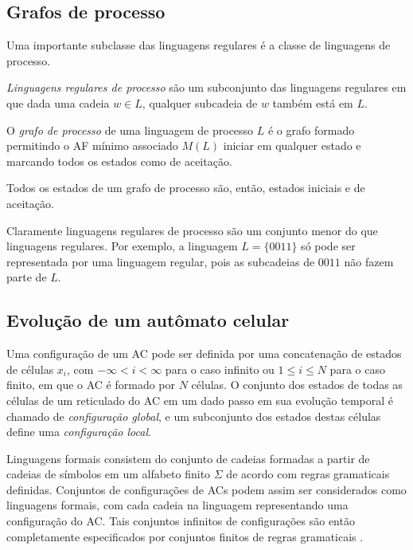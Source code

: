 \documentclass[12pt,a4paper]{article}
\newenvironment{definition}[1][Definição]{\begin{trivlist}
\item[\hskip \labelsep {\bfseries #1}]}{\end{trivlist}}
\begin{document}
\subsection{Grafos de processo}

Uma importante subclasse das linguagens regulares é a classe de linguagens
de processo. 

\begin{definition}
\textit{Linguagens regulares de processo} são um subconjunto das linguagens regulares
em que dada uma cadeia $w \in L$, qualquer subcadeia de $w$ também
está em $L$.
\end{definition}

\begin{definition}
O \textit{grafo de processo} de uma linguagem de processo $L$ é o grafo
formado permitindo o AF mínimo associado $M(L)$ iniciar em qualquer
estado e marcando todos os estados como de aceitação.
\end{definition}

Todos os estados de um grafo de processo são, então, estados iniciais e de
aceitação.

Claramente linguagens regulares de processo são um conjunto menor do que
linguagens regulares. Por exemplo, a linguagem $L = \{0011\}$ só pode ser
representada por uma linguagem regular, pois as subcadeias de $0011$ não
fazem parte de $L$.

\subsection{Evolução de um autômato celular}

Uma configuração de um AC pode ser definida por uma concatenação de estados
de células $x_i$, com $-\infty < i < \infty$ para o caso infinito ou
$1 \le i \le N$ para o caso finito, em que o AC é formado por $N$ células.
O conjunto dos estados de todas as células
de um reticulado do AC em um dado passo em sua evolução temporal é chamado de
\textit{configuração global}, e um subconjunto dos estados destas
células define uma \textit{configuração local}.

Linguagens formais consistem do conjunto de cadeias formadas a partir de
cadeias de símbolos em um alfabeto finito $\Sigma$ de acordo com regras
gramaticais definidas. Conjuntos de configurações de ACs
podem assim ser considerados como linguagens formais, com cada cadeia na
linguagem representando uma configuração do AC. Tais conjuntos
infinitos de configurações são então completamente especificados por
conjuntos finitos de regras gramaticais .
\end{document}

